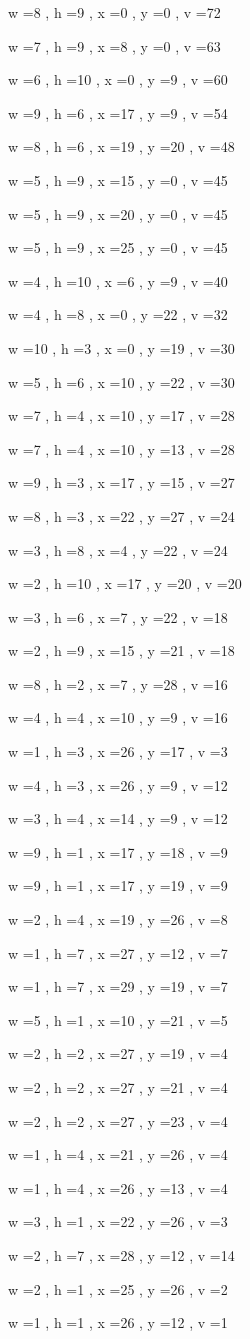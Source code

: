 \documentclass[11pt]{article}
\begin{document}
w =8 , h =9 , x =0 , y =0 , v =72
\par
w =7 , h =9 , x =8 , y =0 , v =63
\par
w =6 , h =10 , x =0 , y =9 , v =60
\par
w =9 , h =6 , x =17 , y =9 , v =54
\par
w =8 , h =6 , x =19 , y =20 , v =48
\par
w =5 , h =9 , x =15 , y =0 , v =45
\par
w =5 , h =9 , x =20 , y =0 , v =45
\par
w =5 , h =9 , x =25 , y =0 , v =45
\par
w =4 , h =10 , x =6 , y =9 , v =40
\par
w =4 , h =8 , x =0 , y =22 , v =32
\par
w =10 , h =3 , x =0 , y =19 , v =30
\par
w =5 , h =6 , x =10 , y =22 , v =30
\par
w =7 , h =4 , x =10 , y =17 , v =28
\par
w =7 , h =4 , x =10 , y =13 , v =28
\par
w =9 , h =3 , x =17 , y =15 , v =27
\par
w =8 , h =3 , x =22 , y =27 , v =24
\par
w =3 , h =8 , x =4 , y =22 , v =24
\par
w =2 , h =10 , x =17 , y =20 , v =20
\par
w =3 , h =6 , x =7 , y =22 , v =18
\par
w =2 , h =9 , x =15 , y =21 , v =18
\par
w =8 , h =2 , x =7 , y =28 , v =16
\par
w =4 , h =4 , x =10 , y =9 , v =16
\par
w =1 , h =3 , x =26 , y =17 , v =3
\par
w =4 , h =3 , x =26 , y =9 , v =12
\par
w =3 , h =4 , x =14 , y =9 , v =12
\par
w =9 , h =1 , x =17 , y =18 , v =9
\par
w =9 , h =1 , x =17 , y =19 , v =9
\par
w =2 , h =4 , x =19 , y =26 , v =8
\par
w =1 , h =7 , x =27 , y =12 , v =7
\par
w =1 , h =7 , x =29 , y =19 , v =7
\par
w =5 , h =1 , x =10 , y =21 , v =5
\par
w =2 , h =2 , x =27 , y =19 , v =4
\par
w =2 , h =2 , x =27 , y =21 , v =4
\par
w =2 , h =2 , x =27 , y =23 , v =4
\par
w =1 , h =4 , x =21 , y =26 , v =4
\par
w =1 , h =4 , x =26 , y =13 , v =4
\par
w =3 , h =1 , x =22 , y =26 , v =3
\par
w =2 , h =7 , x =28 , y =12 , v =14
\par
w =2 , h =1 , x =25 , y =26 , v =2
\par
w =1 , h =1 , x =26 , y =12 , v =1
\par
\newpage
\end{document}
